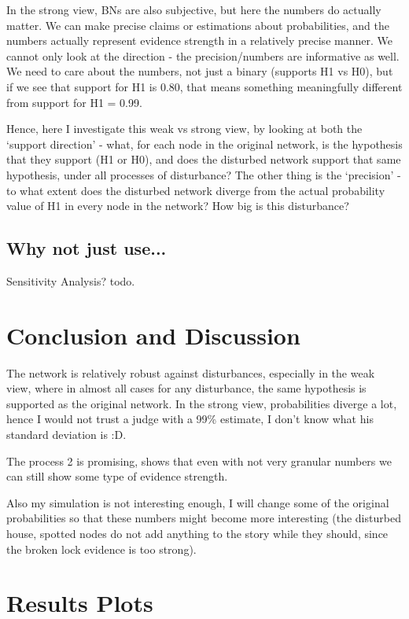 \documentclass[11pt]{amsart}
\begin{document}
In the strong view, BNs are also subjective, but here the numbers do actually matter. We can make precise claims or estimations about probabilities, and the numbers actually represent evidence strength in a relatively precise manner. We cannot only look at the direction - the precision/numbers are informative as well. We need to care about the numbers, not just a binary (supports H1 vs H0), but if we see that support for H1 is 0.80, that means something meaningfully different from support for H1 = 0.99.

Hence, here I investigate this weak vs strong view, by looking at both the `support direction' - what, for each node in the original network, is the hypothesis that they support (H1 or H0), and does the disturbed network support that same hypothesis, under all processes of disturbance?
The other thing is the `precision' - to what extent does the disturbed network diverge from the actual probability value of H1 in every node in the network? How big is this disturbance?

\subsection{Why not just use...}
Sensitivity Analysis?
todo.

\section{Conclusion and Discussion}

The network is relatively robust against disturbances, especially in the weak view, where in almost all cases for any disturbance, the same hypothesis is supported as the original network. In the strong view, probabilities diverge a lot, hence I would not trust a judge with a 99\% estimate, I don't know what his standard deviation is :D.

The process 2 is promising, shows that even with not very granular numbers we can still show some type of evidence strength. 

Also my simulation is not interesting enough, I will change some of the original probabilities so that these numbers might become more interesting (the disturbed house, spotted nodes do not add anything to the story while they should, since the broken lock evidence is too strong).

\clearpage
\section{Results Plots}
\end{document}
